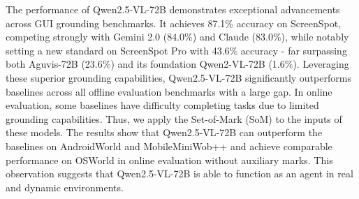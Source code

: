 The performance of Qwen2.5-VL-72B demonstrates exceptional advancements across GUI grounding benchmarks. It achieves 87.1\% accuracy on ScreenSpot, competing strongly with Gemini 2.0 (84.0\%) and Claude (83.0\%), while notably setting a new standard on ScreenSpot Pro with 43.6\% accuracy - far surpassing both Aguvis-72B (23.6\%) and its foundation Qwen2-VL-72B (1.6\%). Leveraging these superior grounding capabilities, Qwen2.5-VL-72B significantly outperforms baselines across all offline evaluation benchmarks with a large gap. In online evaluation, some baselines have difficulty completing tasks due to limited grounding capabilities. Thus, we apply the Set-of-Mark (SoM) to the inputs of these models. The results show that Qwen2.5-VL-72B can outperform the baselines on AndroidWorld and MobileMiniWob++ and achieve comparable performance on OSWorld in online evaluation without auxiliary marks. This observation suggests that Qwen2.5-VL-72B is able to function as an agent in real and dynamic environments.